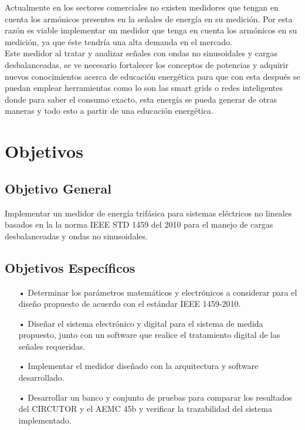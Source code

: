 Actualmente en los sectores comerciales no existen medidores que tengan en cuenta los armónicos presentes en la señales de energía en su medición. Por esta razón  es viable implementar un medidor que tenga en cuenta los armónicos en su medición, ya que éste tendría una alta demanda en el mercado. \\

Este medidor al tratar y analizar señales con ondas no sinusoidales y cargas desbalanceadas, se ve necesario fortalecer los conceptos de potencias y adquirir nuevos conocimientos acerca de educación energética para que con esta después se puedan emplear herramientas como lo son las smart grids o redes inteligentes donde para saber el consumo exacto, esta energía se pueda generar de otras maneras y todo esto a partir de una educación energética.


\newpage{\cleardoublepage}
\chapter{Objetivos}
\section{Objetivo General}

Implementar un medidor de energía trifásica para sistemas eléctricos no lineales    basados en la la norma IEEE STD 1459 del 2010 para el manejo de cargas desbalanceadas y ondas no sinusoidales.

\section{Objetivos Específicos}
\begin{itemize} 
\item[•]Determinar los parámetros matemáticos y electrónicos a considerar para el diseño propuesto de acuerdo con el estándar IEEE 1459-2010. 

\item[•]	Diseñar el sistema electrónico y digital para el sistema de medida propuesto, junto con un software que realice el tratamiento digital de las señales requeridas.

\item[•] Implementar el medidor diseñado con la arquitectura y software desarrollado.

\item[•] Desarrollar un banco y conjunto de pruebas para comparar los resultados del CIRCUTOR y el AEMC 45b y verificar la trazabilidad del sistema implementado. 
 
\end{itemize}



